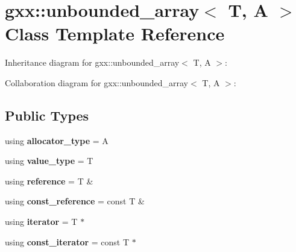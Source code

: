 \hypertarget{classgxx_1_1unbounded__array}{}\section{gxx\+:\+:unbounded\+\_\+array$<$ T, A $>$ Class Template Reference}
\label{classgxx_1_1unbounded__array}


Inheritance diagram for gxx\+:\+:unbounded\+\_\+array$<$ T, A $>$\+:


Collaboration diagram for gxx\+:\+:unbounded\+\_\+array$<$ T, A $>$\+:
\subsection*{Public Types}
\begin{DoxyCompactItemize}
\item 
using {\bfseries allocator\+\_\+type} = A\hypertarget{classgxx_1_1unbounded__array_a2de33c2a63fd4fecd6f02deb30ef7099}{}\label{classgxx_1_1unbounded__array_a2de33c2a63fd4fecd6f02deb30ef7099}

\item 
using {\bfseries value\+\_\+type} = T\hypertarget{classgxx_1_1unbounded__array_acd22f152f35bbcb09db4f71b15a437de}{}\label{classgxx_1_1unbounded__array_acd22f152f35bbcb09db4f71b15a437de}

\item 
using {\bfseries reference} = T \&\hypertarget{classgxx_1_1unbounded__array_a193a286b351a834392fa7f647196af63}{}\label{classgxx_1_1unbounded__array_a193a286b351a834392fa7f647196af63}

\item 
using {\bfseries const\+\_\+reference} = const T \&\hypertarget{classgxx_1_1unbounded__array_a8121cc12044fa580e2dd13c954948864}{}\label{classgxx_1_1unbounded__array_a8121cc12044fa580e2dd13c954948864}

\item 
using {\bfseries iterator} = T $\ast$\hypertarget{classgxx_1_1unbounded__array_a99ba9fb0e166467bab0c3ad319b0a544}{}\label{classgxx_1_1unbounded__array_a99ba9fb0e166467bab0c3ad319b0a544}

\item 
using {\bfseries const\+\_\+iterator} = const T $\ast$\hypertarget{classgxx_1_1unbounded__array_a0389185a378c335b01abb71ae24ece3c}{}\label{classgxx_1_1unbounded__array_a0389185a378c335b01abb71ae24ece3c}

\end{DoxyCompactItemize}
